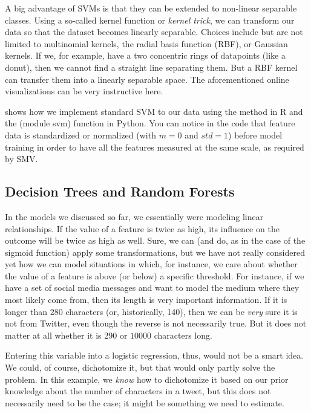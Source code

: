 A big advantage of SVMs is that they can be extended to non-linear
separable classes. Using a so-called kernel function or \emph{kernel trick}, we can transform
our data so that the dataset becomes linearly separable. Choices
include but are not limited to multinomial kernels, the radial basis
function (RBF), or Gaussian kernels. If we, for example, have a two
concentric rings of datapoints (like a donut), then we cannot find a
straight line separating them. But a RBF kernel can transfer them into
a linearly separable space. The aforementioned online visualizations
can be very instructive here.

 shows how we implement standard SVM to our data using the  method  in R and the  (module svm) function  in Python. You can notice in the code that feature data is standardized or normalized (with $m = 0$ and ${std} = 1$) before model training in order to have all the features measured at the same scale, as required by SMV.




\subsection{Decision Trees and Random Forests}
\label{subsec:randomforest}
In the models we discussed so far, we essentially were modeling linear
relationships. If the value of a feature is twice as high, its
influence on the outcome will be twice as high as well.  Sure, we can
(and do, as in the case of the sigmoid function) apply some
transformations, but we have not really considered yet how we can
model situations in which, for instance, we care about whether the
value of a feature is above (or below) a specific threshold.  For
instance, if we have a set of social media messages and want to model
the medium where they most likely come from, then its length is very
important information. If it is longer than 280 characters (or,
historically, 140), then we can be \emph{very} sure it is not from
Twitter, even though the reverse is not necessarily true. But it does
not matter at all whether it is 290 or $10000$ characters long.

Entering this variable into a logistic regression, thus, would not be
a smart idea.  We could, of course, dichotomize it, but that would
only partly solve the problem.  In this example, we \emph{know} how to
dichotomize it based on our prior knowledge about the number of
characters in a tweet, but this does not necessarily need to be the
case; it might be something we need to estimate.

